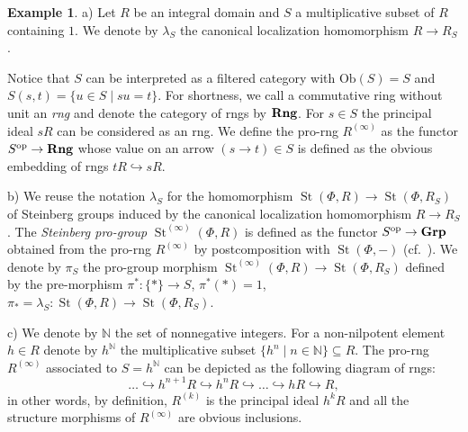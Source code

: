 \documentclass[oneside, 11pt]{amsart}
\numberwithin{equation}{section}
\newcommand{\St}{\mathop{\mathrm{St}}\nolimits}
\theoremstyle{definition}
\newtheorem{example}[lemma]{Example}
\theoremstyle{definition}
\theoremstyle{remark}
\newcommand{\catname}[1]{{\normalfont\textbf{#1}}} %
\begin{document}
\begin{example}
\label{main-example}
a) Let $R$ be an integral domain and $S$ a multiplicative subset of $R$ containing $1$. 
We denote by $\lambda_S$ the canonical localization homomorphism $R \to R_S$.

Notice that $S$ can be interpreted as a filtered category with $\mathrm{Ob}(S) = S$ and $S(s, t) = \{ u \in S \mid su = t \}$.
For shortness, we call a commutative ring without unit an {\it rng} and denote the category of rngs by $\catname{Rng}$.
For $s\in S$ the principal ideal $sR$ can be considered as an rng. We define the pro-rng $R^{(\infty)}$ as the functor $S^\mathrm{op} \to \catname{Rng}$ whose value on an arrow $(s \to t)\in S$ is defined as the obvious embedding of rngs $tR \hookrightarrow sR$. 

b) We reuse the notation $\lambda_S$ for the homomorphism $\St(\Phi, R) \to \St(\Phi, R_S)$ of Steinberg groups induced by the canonical localization homomorphism $R \to R_S$. The {\it Steinberg pro-group} $\St^{(\infty)}(\Phi, R)$ is defined as the functor $S^\mathrm{op} \to \catname{Grp}$ obtained from the pro-rng $R^{(\infty)}$ by postcomposition with $\St(\Phi, -)$ (cf.~\cite[\S~2.4]{LSV20}). We denote by $\pi_S$ the pro-group morphism $\St^{(\infty)}(\Phi, R) \to \St(\Phi, R_S)$ defined by the pre-morphism $\pi^* \colon \{* \} \to S$, $\pi^*(*) = 1$, $\pi_{*} = \lambda_S \colon \St(\Phi, R) \to \St(\Phi, R_S)$. 

c) We denote by $\mathbb N$ the set of nonnegative integers. For a non-nilpotent element $h\in R$ denote by $h^{\mathbb{N}}$ the multiplicative subset $\{ h^n \mid n \in \mathbb{N} \} \subseteq R$. The pro-rng $R^{(\infty)}$ associated to $S=h^\mathbb{N}$ can be depicted as the following diagram of rngs:
\[ \ldots \hookrightarrow h^{n+1} R \hookrightarrow h^n R \hookrightarrow \ldots \hookrightarrow hR \hookrightarrow R, \]
in other words, by definition, $R^{(k)}$ is the principal ideal $h^kR$ and all the structure morphisms of $R^{(\infty)}$ are obvious inclusions.
\end{example}
\end{document}

